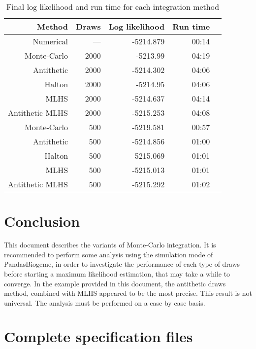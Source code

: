 \documentclass[12pt,a4paper]{article}
\newcommand{\PBIOGEME}{PandasBiogeme}
\begin{document}
\begin{table}[htb]
\begin{center}
\begin{tabular}{rrrrr}
Method & Draws &  Log likelihood & Run time \\
\hline
Numerical & --- & -5214.879 & 00:14 \\
Monte-Carlo  & 2000 & -5213.99 & 04:19 \\
Antithetic & 2000 & -5214.302 & 04:06 \\
Halton & 2000 & -5214.95 & 04:06 \\
MLHS & 2000 & -5214.637 & 04:14    \\
Antithetic MLHS  & 2000 & -5215.253 & 04:08    \\
Monte-Carlo  & 500 & -5219.581 & 00:57 \\
Antithetic & 500 & -5214.856 & 01:00 \\
Halton & 500 & -5215.069 & 01:01 \\
MLHS & 500 & -5215.013 & 01:01    \\
Antithetic MLHS & 500 & -5215.292 & 01:02    \\

\end{tabular}
\end{center}
\caption{\label{tab:estimSummary}Final log likelihood and run time for
each integration method}
\end{table}


\section{Conclusion}

This document describes the variants of Monte-Carlo integration.
It is recommended to perform some analysis using the simulation mode 
 of \PBIOGEME, in order to investigate the performance of
each type of draws  before starting a maximum likelihood  estimation, that may
take a while to converge. In the example provided in this document,
the antithetic draws method, combined with MLHS appeared to be the
most precise. This result is not universal. The analysis must be
performed on a case by case basis.

\clearpage

\appendix

\section{Complete specification files}
\end{document}
